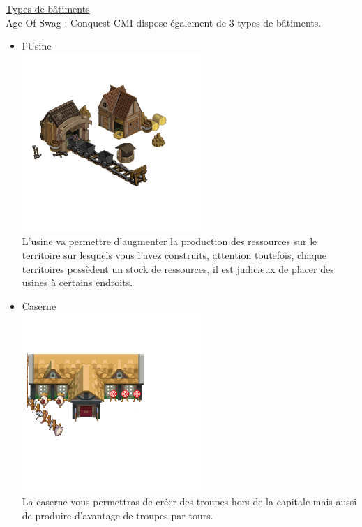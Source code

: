   \underline{Types de bâtiments}\\
  Age Of Swag : Conquest CMI dispose également de 3 types de bâtiments. \\
     \begin{itemize}
    \item l'Usine\\
    \includegraphics[scale=0.3]{bat/fac.png}\\
  L'usine va permettre d'augmenter la production des ressources sur le territoire sur lesquels vous l'avez construits, attention toutefois, chaque territoires possèdent un stock de ressources, il est judicieux de placer des usines à certains endroits.\\
    
    \item Caserne\\
    \includegraphics[scale=0.3]{bat/bar.png}\\
     La caserne vous permettras de créer des troupes hors de la capitale mais aussi de produire d'avantage de troupes par tours.\\
    

\end{itemize}
